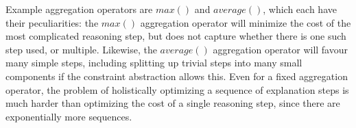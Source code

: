 Example aggregation operators are $max()$ and $average()$, which each have their peculiarities: the $max()$ aggregation operator will minimize the cost of the most complicated reasoning step, but does not capture whether there is one such step used, or multiple. Likewise, the $average()$ aggregation operator will favour many simple steps, including splitting up trivial steps into many small components if the constraint abstraction allows this.
% 
Even for a fixed aggregation operator, the problem of holistically optimizing a sequence of explanation steps is much harder than optimizing the cost of a single reasoning step, since there are exponentially more sequences. 
